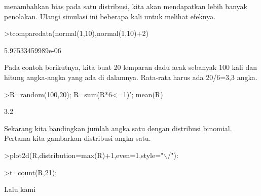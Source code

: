 \documentclass[a4paper,10pt]{article}
\begin{document}
\begin{eulernotebook}
\begin{eulercomment}
\begin{eulercomment}
\begin{eulercomment}
\begin{eulercomment}
\begin{eulercomment}
\begin{eulercomment}
\begin{eulercomment}
\begin{eulercomment}
\begin{eulercomment}
\begin{eulercomment}
\begin{eulercomment}
\begin{eulercomment}
\begin{eulercomment}
\begin{eulercomment}
\begin{eulercomment}
\begin{eulercomment}
\begin{eulercomment}
\begin{eulercomment}
\begin{eulercomment}
\begin{eulercomment}
\begin{eulercomment}
\begin{eulercomment}
\begin{eulercomment}
\begin{eulercomment}
\begin{eulercomment}
\begin{eulercomment}
\begin{eulercomment}
\begin{eulercomment}
\begin{eulercomment}
\begin{eulercomment}
\begin{eulercomment}
\begin{eulercomment}
\begin{eulercomment}
\begin{eulercomment}
\begin{eulercomment}
\begin{eulercomment}
\begin{eulercomment}
\begin{eulercomment}
\begin{eulercomment}
\begin{eulercomment}
\begin{eulercomment}
\begin{eulercomment}
\begin{eulercomment}
\begin{eulercomment}
\begin{eulercomment}
\begin{eulercomment}
\begin{eulercomment}
\begin{eulercomment}
\begin{eulercomment}
\begin{eulercomment}
\begin{eulercomment}
\begin{eulercomment}
\begin{eulercomment}
\begin{eulercomment}
\begin{eulercomment}
\begin{eulercomment}
\begin{eulercomment}
\begin{eulercomment}
\begin{eulercomment}
\begin{eulercomment}
\begin{eulercomment}
\begin{eulercomment}
\begin{eulercomment}
\begin{eulercomment}
\begin{eulercomment}
\begin{eulercomment}
\begin{eulercomment}
menambahkan bias pada satu distribusi, kita akan mendapatkan
lebih banyak penolakan. Ulangi simulasi ini beberapa kali untuk
melihat efeknya.
\end{eulercomment}
\begin{eulerprompt}
>tcomparedata(normal(1,10),normal(1,10)+2)
\end{eulerprompt}
\begin{euleroutput}
  5.97533459989e-06
\end{euleroutput}
\begin{eulercomment}
Pada contoh berikutnya, kita buat 20 lemparan dadu acak sebanyak 100
kali dan hitung angka-angka yang ada di dalamnya. Rata-rata harus ada
20/6=3,3 angka.
\end{eulercomment}
\begin{eulerprompt}
>R=random(100,20); R=sum(R*6<=1)'; mean(R)
\end{eulerprompt}
\begin{euleroutput}
  3.2
\end{euleroutput}
\begin{eulercomment}
Sekarang kita bandingkan jumlah angka satu dengan distribusi binomial.
Pertama kita gambarkan distribusi angka satu.
\end{eulercomment}
\begin{eulerprompt}
>plot2d(R,distribution=max(R)+1,even=1,style="\(\backslash\)/"):
\end{eulerprompt}
\begin{eulerprompt}
>t=count(R,21);
\end{eulerprompt}
\begin{eulercomment}
Lalu kami 
\end{eulercomment}
\end{eulercomment}
\end{eulercomment}
\end{eulercomment}
\end{eulercomment}
\end{eulercomment}
\end{eulercomment}
\end{eulercomment}
\end{eulercomment}
\end{eulercomment}
\end{eulercomment}
\end{eulercomment}
\end{eulercomment}
\end{eulercomment}
\end{eulercomment}
\end{eulercomment}
\end{eulercomment}
\end{eulercomment}
\end{eulercomment}
\end{eulercomment}
\end{eulercomment}
\end{eulercomment}
\end{eulercomment}
\end{eulercomment}
\end{eulercomment}
\end{eulercomment}
\end{eulercomment}
\end{eulercomment}
\end{eulercomment}
\end{eulercomment}
\end{eulercomment}
\end{eulercomment}
\end{eulercomment}
\end{eulercomment}
\end{eulercomment}
\end{eulercomment}
\end{eulercomment}
\end{eulercomment}
\end{eulercomment}
\end{eulercomment}
\end{eulercomment}
\end{eulercomment}
\end{eulercomment}
\end{eulercomment}
\end{eulercomment}
\end{eulercomment}
\end{eulercomment}
\end{eulercomment}
\end{eulercomment}
\end{eulercomment}
\end{eulercomment}
\end{eulercomment}
\end{eulercomment}
\end{eulercomment}
\end{eulercomment}
\end{eulercomment}
\end{eulercomment}
\end{eulercomment}
\end{eulercomment}
\end{eulercomment}
\end{eulercomment}
\end{eulercomment}
\end{eulercomment}
\end{eulercomment}
\end{eulercomment}
\end{eulercomment}
\end{eulercomment}
\end{eulernotebook}
\end{document}
